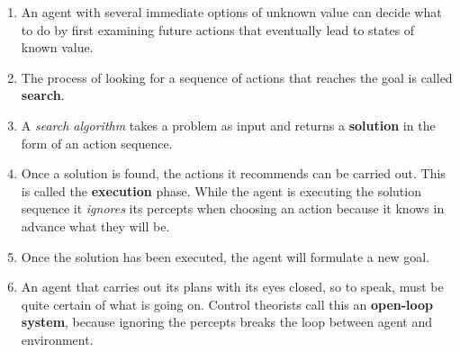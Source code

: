 \begin{enumerate}[itemsep=0.2cm]
    \item An agent with several immediate options of unknown value can decide what to do by first examining future actions that eventually lead to states of known value.
    \hfill \cite{ai/book/Artificial-Intelligence-A-Modern-Approach/Russell-Norvig}

    \item The process of looking for a sequence of actions that reaches the goal is called \textbf{search}.
    \hfill \cite{ai/book/Artificial-Intelligence-A-Modern-Approach/Russell-Norvig}

    \item A \textit{search algorithm} takes a problem as input and returns a \textbf{solution} in the form of an action sequence.
    \hfill \cite{ai/book/Artificial-Intelligence-A-Modern-Approach/Russell-Norvig}

    \item Once a solution is found, the actions it recommends can be carried out. This is called the \textbf{execution} phase.
    While the agent is executing the solution sequence it \textit{ignores} its percepts when choosing an action because it knows in advance what they will be.
    \hfill \cite{ai/book/Artificial-Intelligence-A-Modern-Approach/Russell-Norvig}

    \item Once the solution has been executed, the agent will formulate a new goal.
    \hfill \cite{ai/book/Artificial-Intelligence-A-Modern-Approach/Russell-Norvig}

    \item An agent that carries out its plans with its eyes closed, so to speak, must be quite certain of what is going on. Control theorists call this an \textbf{open-loop system}, because ignoring the percepts breaks the loop between agent and environment.
    \hfill \cite{ai/book/Artificial-Intelligence-A-Modern-Approach/Russell-Norvig}
\end{enumerate}








\vspace{0.5cm}


